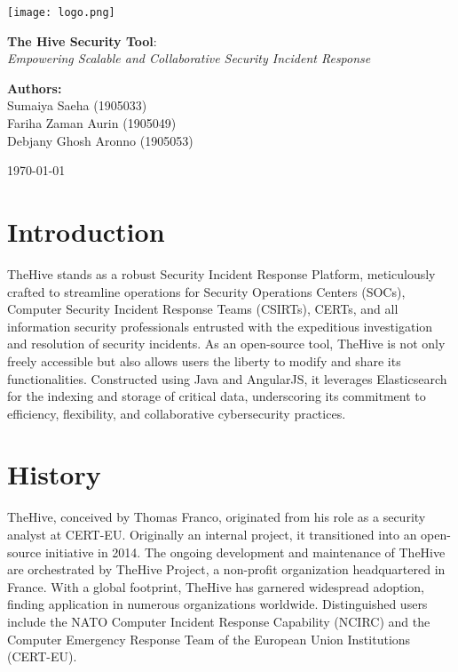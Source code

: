 \documentclass{article}
\begin{document}
\begin{titlepage}
    \centering
    \texttt{[image: logo.png]}\par\vspace{2cm}
    {\fontsize{24}{28.8}\selectfont \textbf{The Hive Security Tool}:\\[0.5cm] \textit{Empowering Scalable and Collaborative Security Incident Response}}\par\vspace{3cm}
    {\fontsize{14}{16}\selectfont \textbf{Authors:}\\[0.3cm]
    Sumaiya Saeha (1905033)\\
    Fariha Zaman Aurin (1905049)\\
    Debjany Ghosh Aronno (1905053)}\par\vspace{2cm}
    \today
\end{titlepage}

\tableofcontents
\newpage

\section{Introduction}
TheHive stands as a robust Security Incident Response Platform, meticulously crafted to streamline operations for Security Operations Centers (SOCs), Computer Security Incident Response Teams (CSIRTs), CERTs, and all information security professionals entrusted with the expeditious investigation and resolution of security incidents. As an open-source tool, TheHive is not only freely accessible but also allows users the liberty to modify and share its functionalities. Constructed using Java and AngularJS, it leverages Elasticsearch for the indexing and storage of critical data, underscoring its commitment to efficiency, flexibility, and collaborative cybersecurity practices.

\section{History}
TheHive, conceived by Thomas Franco, originated from his role as a security analyst at CERT-EU. Originally an internal project, it transitioned into an open-source initiative in 2014. The ongoing development and maintenance of TheHive are orchestrated by TheHive Project, a non-profit organization headquartered in France. With a global footprint, TheHive has garnered widespread adoption, finding application in numerous organizations worldwide. Distinguished users include the NATO Computer Incident Response Capability (NCIRC) and the Computer Emergency Response Team of the European Union Institutions (CERT-EU).
\end{document}

